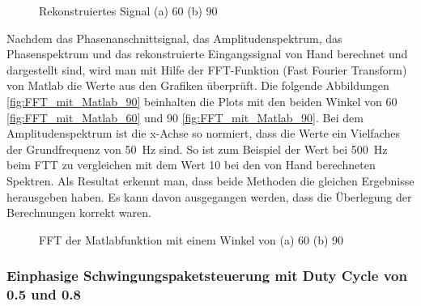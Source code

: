 \begin{figure}[h]
	\centering
	\qquad
	\caption{Rekonstruiertes Signal (a) 60\textdegree \hspace{0.02cm} (b) 90\textdegree}
	\label{fig:Rekonstruiertes Signal}
\end{figure} 


Nachdem das Phasenanschnittsignal, das Amplitudenspektrum,  das Phasenspektrum und das rekonstruierte Eingangssignal von Hand berechnet und dargestellt sind, wird man mit Hilfe der FFT-Funktion (Fast Fourier Transform) von Matlab die Werte aus den Grafiken überprüft. Die folgende Abbildungen \ref{fig:FFT_mit_Matlab_90} beinhalten die Plots mit den beiden Winkel von 60\textdegree \hspace{0.02cm} \ref{fig:FFT_mit_Matlab_60} und 90\textdegree \hspace{0.02cm} \ref{fig:FFT_mit_Matlab_90}. Bei dem Amplitudenspektrum ist die x-Achse so normiert, dass die Werte ein Vielfaches der Grundfrequenz von \SI{50}{Hz} sind. So ist zum Beispiel der Wert bei \SI{500}{Hz} beim FTT zu vergleichen mit dem Wert 10 bei den von Hand berechneten Spektren. Als Resultat erkennt man, dass beide Methoden die gleichen Ergebnisse herausgeben haben. Es kann davon ausgegangen werden, dass die Überlegung der Berechnungen korrekt waren.

\begin{figure}[h]
	\centering
	\qquad
	\caption{FFT der Matlabfunktion mit einem Winkel von (a) 60\textdegree \hspace{0.02cm} (b) 90\textdegree}
	\label{fig:FFT_mit_Matlab}
\end{figure}

\newpage

\subsubsection{Einphasige Schwingungspaketsteuerung mit Duty Cycle von 0.5 und 0.8}

